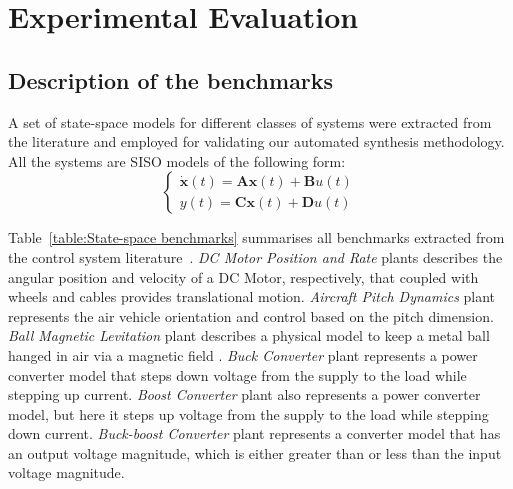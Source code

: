 \documentclass[runningheads,a4paper]{llncs}
\begin{document}
\section{Experimental Evaluation}


\subsection{Description of the benchmarks}

A set of state-space models for different classes of 
systems were extracted from the literature and employed 
for validating our automated synthesis methodology. 
All the systems are SISO models of the following form:
%
\begin{equation}
\left\lbrace\begin{array}{c}
\dot{\textbf{x}}(t)=\textbf{A}\textbf{x}(t)+\textbf{B}u(t)\\
y(t)=\textbf{C}\textbf{x}(t)+\textbf{D}u(t)
\end{array}\right.
\end{equation}

Table~\ref{table:State-space benchmarks} summarises all benchmarks extracted 
from the control system literature~\cite{Franklin15,maglev,converters,CTMS}. 
\textit{DC Motor Position and Rate} plants describes the angular position and 
velocity of a DC Motor, respectively, that coupled with wheels and cables provides 
translational motion. 
\textit{Aircraft Pitch Dynamics} plant represents the air vehicle orientation and 
control based on the pitch dimension. 
\textit{Ball Magnetic Levitation} plant describes a physical model to keep a 
metal ball hanged in air via a magnetic field . 
\textit{Buck Converter} plant represents a power converter model that steps down 
voltage from the supply to the load while stepping up current. 
\textit{Boost Converter} plant also represents a power converter model, but here 
it steps up voltage from the supply to the load while stepping down current. 
\textit{Buck-boost Converter} plant represents a converter model that has an output 
voltage magnitude, which is either greater than or less than the input voltage magnitude. 
\end{document}
